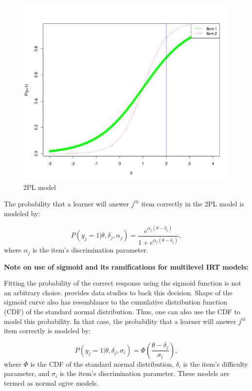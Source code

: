 \documentclass[12pt]{article}
\begin{document}
\begin{figure}[t]
    \includegraphics[scale=0.5]{Plots/2pl.png}
    \centering
    \caption{2PL model}
    \label{fig:2pl}
\end{figure}

The probability that a learner will answer $j^{th}$ item correctly in the 2PL model is modeled by:

\begin{equation}\label{eq:2pl}
    P(y_j=1|\theta, \delta_j, \alpha_j) = \frac{e^{\alpha_j(\theta - \delta_j)}}{1+e^{\alpha_j(\theta - \delta_j)}},
\end{equation}
where $\alpha_j$ is the item's discrimination parameter.

\textbf{Note on use of sigmoid and its ramifications for multilevel IRT models:}

Fitting the probability of the correct response using the sigmoid function is not an arbitrary choice. \cite{de2013theory} provides data studies to back this decision. Shape of the sigmoid curve also has resemblance to the cumulative distribution function (CDF) of the standard normal distribution. Thus, one can also use the CDF to model this probability. In that case, the probability that a learner will answer $j^{th}$ item correctly is modeled by:

\begin{equation}\label{eq:2pl_normal_ogive}
    P(y_j=1|\theta, \delta_j, \sigma_i) = \Phi(\frac{\theta - \delta_j}{\sigma_i}),
\end{equation}
where $\Phi$ is the CDF of the standard normal distribution, $\delta_i$ is the item's difficulty parameter, and $\sigma_i$ is the item's discrimination parameter. These models are termed as normal ogive models.
\end{document}
